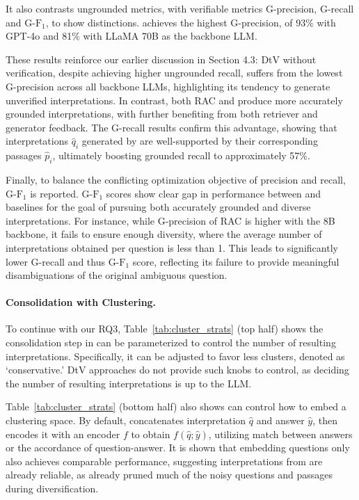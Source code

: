 It also contrasts
ungrounded metrics, with verifiable metrics G-precision, G-recall and G-$\textrm{F}_1$, to show distinctions.
\ours achieves the highest G-precision, of 93\% with GPT-4o and 81\% with LLaMA 70B as the backbone LLM.

These results reinforce our earlier discussion in Section 4.3:  DtV without verification, despite achieving higher ungrounded recall, suffers from the lowest G-precision across all backbone LLMs, highlighting its tendency to generate unverified interpretations. In contrast, both RAC and \ours produce more accurately grounded interpretations, with \ours further benefiting from both retriever and generator feedback. The G-recall results confirm this advantage, showing that interpretations $\hat{q}_i$ generated by \ours are well-supported by their corresponding passages $\hat{p}_i$, ultimately boosting grounded recall to approximately 57\%.




Finally, to balance the conflicting optimization objective of precision and recall, G-$\textrm{F}_1$ is reported.
G-$\textrm{F}_1$ scores show clear gap in performance between \ours and baselines for the goal of pursuing both accurately grounded and diverse interpretations.
For instance, while G-precision of RAC is higher with the 8B backbone, it fails to ensure enough diversity, where the average number of interpretations obtained per question is less than 1.
This leads to significantly lower G-recall and thus G-$\textrm{F}_1$ score, reflecting its failure to provide meaningful disambiguations of the original ambiguous question.














\paragraph{Consolidation with Clustering.}
To continue with our RQ3, Table~\ref{tab:cluster_strats} (top half) shows the consolidation step in \ours can be parameterized
to control the number of resulting interpretations.
Specifically, it can be adjusted to %
favor less clusters, denoted as `conservative.'
DtV approaches do not provide such knobs to control,
as deciding the number of resulting interpretations is up to the LLM.

Table~\ref{tab:cluster_strats} (bottom half) also shows \ours can 
control how to embed
a clustering space.
By default, \ours concatenates interpretation $\hat{q}$ and answer $\hat{y}$, then encodes it with an encoder $f$ to obtain $f(\hat{q};\hat{y})$, utilizing match between answers or the accordance of question-answer.
It is shown that embedding questions only also achieves comparable performance,
suggesting interpretations from \ours are already reliable,
as \ours already pruned much of the noisy questions and passages during diversification.


